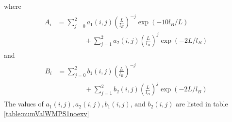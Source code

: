 where
\begin{align}
\begin{split}
A_i &= \sum_{j=0}^2a_1(i,j) \left(\frac{L}{l_B}\right)^{-j} \exp(-10 l_B/L) \\
& \qquad \qquad + \sum_{j=1}^2a_2(i,j) \left(\frac{L}{l_B}\right)^{j} \exp(-2 L/l_B)
\end{split}
\end{align}
and
\begin{align}
\begin{split}
B_i & = \sum_{j=0}^2b_1(i,j) \left(\frac{L}{l_B}\right)^{-j} \\
    & \qquad \qquad + \sum_{j=1}^2b_2(i,j) \left(\frac{L}{l_B}\right)^{j} \exp(-2 L/l_B)
\end{split}
\end{align}
The values of $a_1(i,j), a_2(i,j), b_1(i,j)$, and $b_2(i,j)$ are listed in table \ref{table:numValWMPS1noexv}
